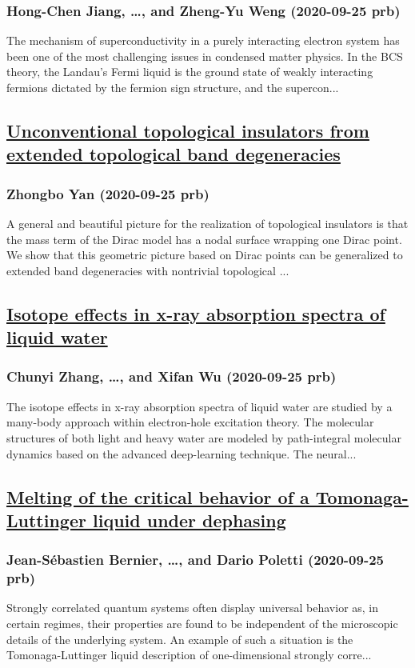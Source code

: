 \subsubsection*{Hong-Chen Jiang, \dots, and Zheng-Yu Weng (2020-09-25 prb)}
The mechanism of superconductivity in a purely interacting electron system has been one of the most challenging issues in condensed matter physics. In the BCS theory, the Landau's Fermi liquid is the ground state of weakly interacting fermions dictated by the fermion sign structure, and the supercon...
\subsection*{\href{http://link.aps.org/doi/10.1103/PhysRevB.102.115151}{Unconventional topological insulators from extended topological band degeneracies}}
\subsubsection*{Zhongbo Yan (2020-09-25 prb)}
A general and beautiful picture for the realization of topological insulators is that the mass term of the Dirac model has a nodal surface wrapping one Dirac point. We show that this geometric picture based on Dirac points can be generalized to extended band degeneracies with nontrivial topological ...
\subsection*{\href{http://link.aps.org/doi/10.1103/PhysRevB.102.115155}{Isotope effects in x-ray absorption spectra of liquid water}}
\subsubsection*{Chunyi Zhang, \dots, and Xifan Wu (2020-09-25 prb)}
The isotope effects in x-ray absorption spectra of liquid water are studied by a many-body approach within electron-hole excitation theory. The molecular structures of both light and heavy water are modeled by path-integral molecular dynamics based on the advanced deep-learning technique. The neural...
\subsection*{\href{http://link.aps.org/doi/10.1103/PhysRevB.102.115156}{Melting of the critical behavior of a Tomonaga-Luttinger liquid under dephasing}}
\subsubsection*{Jean-Sébastien Bernier, \dots, and Dario Poletti (2020-09-25 prb)}
Strongly correlated quantum systems often display universal behavior as, in certain regimes, their properties are found to be independent of the microscopic details of the underlying system. An example of such a situation is the Tomonaga-Luttinger liquid description of one-dimensional strongly corre...
